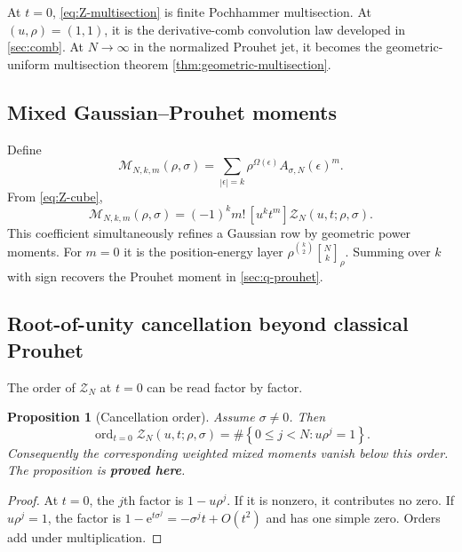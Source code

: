 \documentclass[11pt,oneside]{article}
\numberwithin{equation}{section}
\newtheorem{proposition}[theorem]{Proposition}
\theoremstyle{definition}
\theoremstyle{remark}
\newcommand{\ord}{\operatorname{ord}}
\newcommand{\e}{\mathrm e}
\newcommand{\qbinom}[3]{\genfrac{[}{]}{0pt}{}{#1}{#2}_{#3}}
\newcommand{\proved}{\textcolor{deepgreen}{\textbf{proved here}}}
\newcommand{\Zpart}{\mathscr Z}
\begin{document}
At $t=0$, \eqref{eq:Z-multisection} is finite Pochhammer multisection.  At
$(u,\rho)=(1,1)$, it is the derivative-comb convolution law developed in
\cref{sec:comb}.  At $N\to\infty$ in the normalized Prouhet jet, it becomes the
geometric-uniform multisection theorem \ref{thm:geometric-multisection}.

\subsection{Mixed Gaussian--Prouhet moments}

Define
\begin{equation}
 \mathcal M_{N,k,m}(\rho,\sigma)=
 \sum_{|\epsilon|=k}
 \rho^{\Omega(\epsilon)}A_{\sigma,N}(\epsilon)^m.
 \label{eq:mixed-moments}
\end{equation}
From \eqref{eq:Z-cube},
\begin{equation}
 \boxed{
 \mathcal M_{N,k,m}(\rho,\sigma)
 =(-1)^k m!\,[u^kt^m]\Zpart_N(u,t;\rho,\sigma).}
 \label{eq:mixed-coefficient}
\end{equation}
This coefficient simultaneously refines a Gaussian row by geometric power
moments.  For $m=0$ it is the position-energy layer
$\rho^{\binom k2}\qbinom{N}{k}{\rho}$.  Summing over $k$ with sign recovers the
Prouhet moment in \cref{sec:q-prouhet}.

\subsection{Root-of-unity cancellation beyond classical Prouhet}

The order of $\Zpart_N$ at $t=0$ can be read factor by factor.

\begin{proposition}[Cancellation order]
\label{prop:Z-order}
Assume $\sigma\ne0$.  Then
\begin{equation}
 \ord_{t=0}\Zpart_N(u,t;\rho,\sigma)
 =\#\left\{0\le j<N:u\rho^j=1\right\}.
 \label{eq:Z-order}
\end{equation}
Consequently the corresponding weighted mixed moments vanish below this
order.  The proposition is \proved.
\end{proposition}

\begin{proof}
At $t=0$, the $j$th factor is $1-u\rho^j$.  If it is nonzero, it contributes
no zero.  If $u\rho^j=1$, the factor is
$1-\e^{t\sigma^j}=-\sigma^jt+O(t^2)$ and has one simple zero.  Orders add under
multiplication.
\end{proof}
\end{document}
